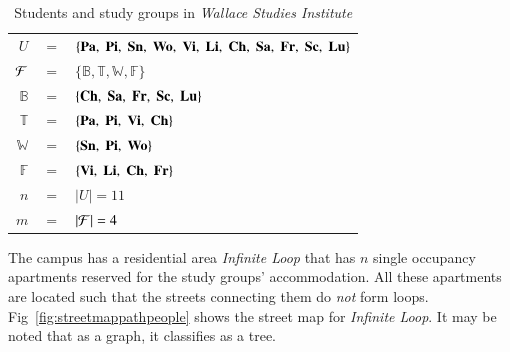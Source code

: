 \documentclass[MS,synopsis]{iitmdiss}
\def \figtabsize {\footnotesize}
\def \xLLL {\mathbb{B}}
\def \xGGG {\mathbb{T}}
\def \xBBB {\mathbb{W}}
\def \xTTT {\mathbb{F}}
\def \xPa {{\bf Pa}}
\def \xPi {{\bf Pi}}
\def \xSn {{\bf Sn}}
\def \xWo {{\bf Wo}}
\def \xVi {{\bf Vi}}
\def \xLi {{\bf Li}}
\def \xCh {{\bf Ch}}
\def \xSa {{\bf Sa}}
\def \xFr {{\bf Fr}}
\def \xSc {{\bf Sc}}
\def \xLu {{\bf Lu}}
\def \residenceblock {{\em Infinite Loop}}
\def \WSI {{\em Wallace Studies Institute}}
\begin{document}


\begin{table}[htbp]
  \centering
  { \footnotesize
  \begin{tabular}{rcl}
    $U $&$=$&$ \{\xPa,\; \xPi,\; \xSn,\; \xWo,\; \xVi,\; \xLi,\; \xCh,\;
    \xSa,\; \xFr,\; \xSc,\; \xLu\}$\\
    ${\cal F} $&$=$&$ \{\xLLL, \xGGG, \xBBB, \xTTT\}$\\
    $\xLLL $&$=$&$ \{\xCh,\;  \xSa,\;  \xFr,\;  \xSc,\;  \xLu \}$\\
    $\xGGG $&$=$&$ \{\xPa,\;  \xPi,\;  \xVi,\;  \xCh \}$\\
    $\xBBB $&$=$&$ \{\xSn,\;  \xPi,\;  \xWo \}$\\
    $\xTTT $&$=$&$ \{\xVi,\;  \xLi,\;  \xCh,\;  \xFr \}$\\
    $n $&$=$&$ |U| = 11$\\
    $m $&$=$&$ |{\cal F}| = 4$      
  \end{tabular}
}
  \caption{\figtabsize Students and study groups in \WSI}
  \label{tab:wsigroups}
\end{table}

The campus has a residential area {\residenceblock} that has $n$
single occupancy apartments reserved for the study groups'
accommodation.  All these apartments are located such that the streets
connecting them do {\em not} form
loops. Fig~\ref{fig:streetmappathpeople} 
shows the street map for {\residenceblock}. It may be noted that as a
graph, it classifies as a tree.
\end{document}
